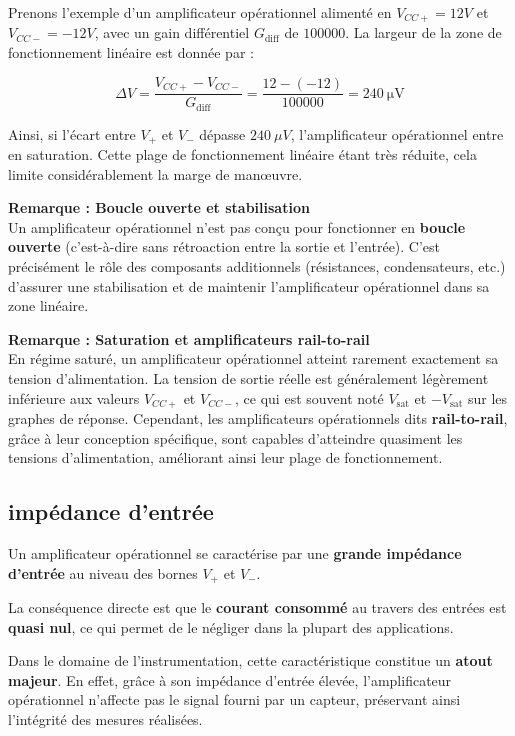 Prenons l'exemple d'un amplificateur opérationnel alimenté en \(V_{CC+}=12V\) 
et \( V_{CC-} = -12V \), avec un gain différentiel \( G_{\text{diff}} \) de 
\( 100000 \). La largeur de la zone de fonctionnement linéaire est donnée par :

\[
\Delta V = \frac{V_{CC+} - V_{CC-}}{G_{\text{diff}}} = \frac{12 - (-12)}{100000} = \SI{240}{\micro\volt}
\]

Ainsi, si l'écart entre \( V_+ \) et \( V_- \) dépasse \( 240\ \mu V \), 
l'amplificateur opérationnel entre en saturation. Cette plage de fonctionnement 
linéaire étant très réduite, cela limite considérablement la marge de manœuvre.

\textbf{Remarque : Boucle ouverte et stabilisation}\\
Un amplificateur opérationnel n'est pas conçu pour fonctionner en 
\textbf{boucle ouverte} (c'est-à-dire sans rétroaction entre la sortie et 
l'entrée). C'est précisément le rôle des composants additionnels (résistances, 
condensateurs, etc.) d'assurer une stabilisation et de maintenir l'amplificateur 
opérationnel dans sa zone linéaire.

\textbf{Remarque : Saturation et amplificateurs rail-to-rail}\\
En régime saturé, un amplificateur opérationnel atteint rarement exactement sa 
tension d'alimentation. La tension de sortie réelle est généralement légèrement 
inférieure aux valeurs \( V_{CC+} \) et \( V_{CC-} \), ce qui est souvent noté 
\( V_{\text{sat}} \) et \( -V_{\text{sat}} \) sur les graphes de réponse. 
Cependant, les amplificateurs opérationnels dits \textbf{rail-to-rail}, grâce à 
leur conception spécifique, sont capables d'atteindre quasiment les tensions 
d'alimentation, améliorant ainsi leur plage de fonctionnement.

\subsection{impédance d'entrée}
Un amplificateur opérationnel se caractérise par une 
\textbf{grande impédance d’entrée} au niveau des bornes \( V_+ \) et \( V_- \). 

La conséquence directe est que le \textbf{courant consommé} au travers des 
entrées est \textbf{quasi nul}, ce qui permet de le négliger dans la plupart des 
applications.

Dans le domaine de l’instrumentation, cette caractéristique constitue un 
\textbf{atout majeur}. En effet, grâce à son impédance d’entrée élevée, 
l’amplificateur opérationnel n'affecte pas le signal fourni par un capteur, 
préservant ainsi l’intégrité des mesures réalisées. 

